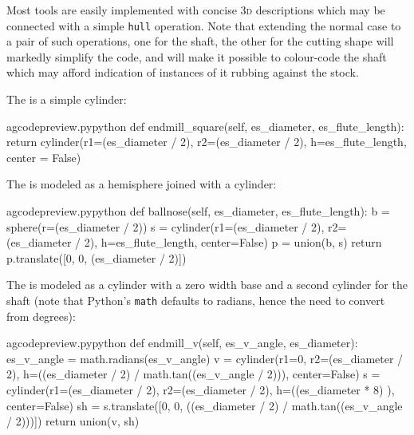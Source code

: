 \documentclass{ltxdoc}
\begin{document}
Most tools are easily implemented with concise \textsc{3d} descriptions which may be connected with a simple \texttt{hull} operation. Note that extending the normal case to a pair of such operations, one for the shaft, the other for the cutting shape will markedly simplify the code, and will make it possible to colour-code the shaft which may afford indication of instances of it rubbing against the stock.

The  is a simple cylinder:

\lstset{firstnumber=\thegcpy}
\begin{writecode}{a}{gcodepreview.py}{python}
    def endmill_square(self, es_diameter, es_flute_length):
        return cylinder(r1=(es_diameter / 2), r2=(es_diameter / 2), h=es_flute_length, center = False)

\end{writecode}
\addtocounter{gcpy}{3}

The  is modeled as a hemisphere joined with a cylinder:

\lstset{firstnumber=\thegcpy}
\begin{writecode}{a}{gcodepreview.py}{python}
    def ballnose(self, es_diameter, es_flute_length):
        b = sphere(r=(es_diameter / 2))
        s = cylinder(r1=(es_diameter / 2), r2=(es_diameter / 2), h=es_flute_length, center=False)
        p = union(b, s)
        return p.translate([0, 0, (es_diameter / 2)])

\end{writecode}
\addtocounter{gcpy}{6}

The  is modeled as a cylinder with a zero width base and a second cylinder for the shaft (note that Python's \verb|math| defaults to radians, hence the need to convert from degrees):

\lstset{firstnumber=\thegcpy}
\begin{writecode}{a}{gcodepreview.py}{python}
    def endmill_v(self, es_v_angle, es_diameter):
        es_v_angle = math.radians(es_v_angle)
        v = cylinder(r1=0, r2=(es_diameter / 2), h=((es_diameter / 2) / math.tan((es_v_angle / 2))), center=False)
        s = cylinder(r1=(es_diameter / 2), r2=(es_diameter / 2), h=((es_diameter * 8) ), center=False)
        sh = s.translate([0, 0, ((es_diameter / 2) / math.tan((es_v_angle / 2)))])
        return union(v, sh)

\end{writecode}
\addtocounter{gcpy}{7}
\end{document}
